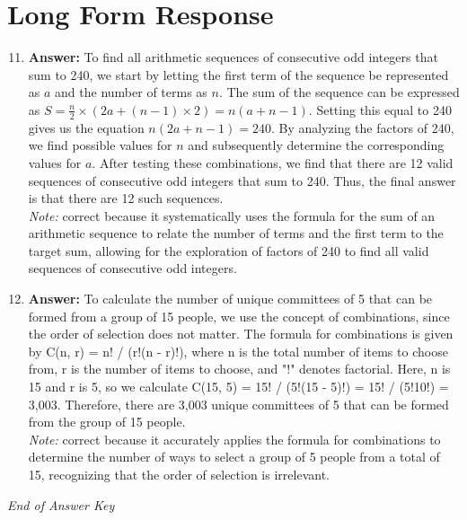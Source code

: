 \documentclass[12pt]{article}
\begin{document}
\section*{Long Form Response}
\begin{enumerate}[label=\arabic*.]
\setcounter{enumi}{10}
\item \textbf{Answer:} To find all arithmetic sequences of consecutive odd integers that sum to 240, we start by letting the first term of the sequence be represented as \( a \) and the number of terms as \( n \). The sum of the sequence can be expressed as \( S = \frac{n}{2} \times (2 a + (n-1) \times 2) = n(a + n - 1) \). Setting this equal to 240 gives us the equation \( n(2 a + n - 1) = 240 \). By analyzing the factors of 240, we find possible values for \( n \) and subsequently determine the corresponding values for \( a \). After testing these combinations, we find that there are 12 valid sequences of consecutive odd integers that sum to 240. Thus, the final answer is that there are 12 such sequences.
\\ \textit{Note:} correct because it systematically uses the formula for the sum of an arithmetic sequence to relate the number of terms and the first term to the target sum, allowing for the exploration of factors of 240 to find all valid sequences of consecutive odd integers.
\item \textbf{Answer:} To calculate the number of unique committees of 5 that can be formed from a group of 15 people, we use the concept of combinations, since the order of selection does not matter. The formula for combinations is given by C(n, r) = n! / (r!(n - r)!), where n is the total number of items to choose from, r is the number of items to choose, and "!" denotes factorial. Here, n is 15 and r is 5, so we calculate C(15, 5) = 15! / (5!(15 - 5)!) = 15! / (5!10!) = 3,003. Therefore, there are 3,003 unique committees of 5 that can be formed from the group of 15 people.
\\ \textit{Note:} correct because it accurately applies the formula for combinations to determine the number of ways to select a group of 5 people from a total of 15, recognizing that the order of selection is irrelevant.
\end{enumerate}

\vfill
\noindent\textit{End of Answer Key}
\end{document}
